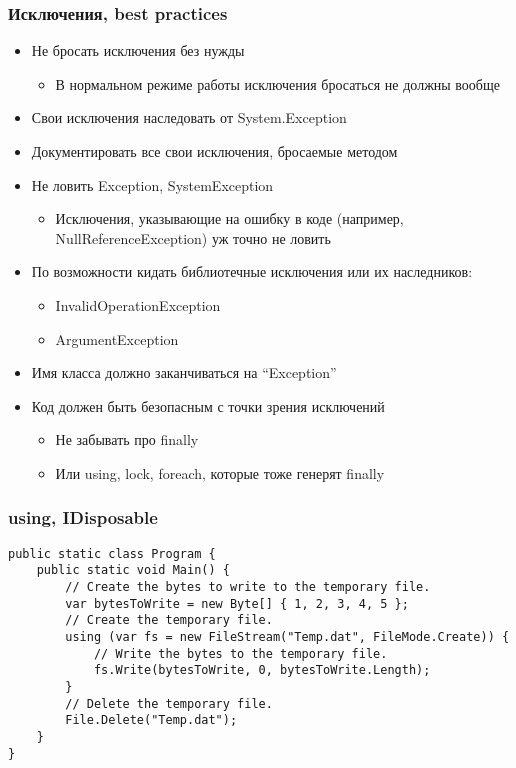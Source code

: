 \documentclass[xetex,mathserif,serif]{beamer}
\begin{document}
	\begin{frame}
		\frametitle{Исключения, best practices}
		\begin{itemize}
			\item Не бросать исключения без нужды
			\begin{itemize}
				\item В нормальном режиме работы исключения бросаться не должны вообще
			\end{itemize}
			\item Свои исключения наследовать от System.Exception
			\item Документировать все свои исключения, бросаемые методом
			\item Не ловить Exception, SystemException
			\begin{itemize}
				\item Исключения, указывающие на ошибку в коде (например, NullReferenceException) уж точно не ловить
			\end{itemize}
			\item По возможности кидать библиотечные исключения или их наследников:
			\begin{itemize}
				\item InvalidOperationException
				\item ArgumentException
			\end{itemize}
			\item Имя класса должно заканчиваться на ``Exception''
			\item Код должен быть безопасным с точки зрения исключений
			\begin{itemize}
				\item Не забывать про finally 
				\item Или using, lock, foreach, которые тоже генерят finally
			\end{itemize}
		\end{itemize}
	\end{frame}

	\begin{frame}[fragile]
		\frametitle{using, IDisposable}
		\begin{small}
			\begin{verbatim}
public static class Program {
    public static void Main() {
        // Create the bytes to write to the temporary file.
        var bytesToWrite = new Byte[] { 1, 2, 3, 4, 5 };
        // Create the temporary file.
        using (var fs = new FileStream("Temp.dat", FileMode.Create)) {
            // Write the bytes to the temporary file.
            fs.Write(bytesToWrite, 0, bytesToWrite.Length);
        }
        // Delete the temporary file.
        File.Delete("Temp.dat");
    }
}
			\end{verbatim}
		\end{small}
	\end{frame}
\end{document}
